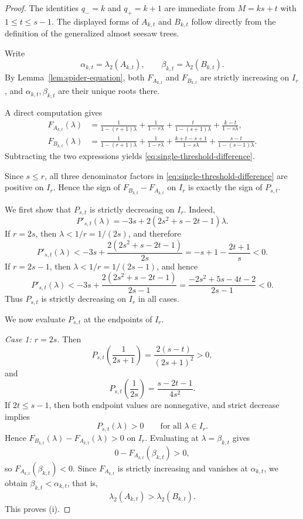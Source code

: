 \documentclass[11pt]{article}
\theoremstyle{remark}
\begin{document}
\begin{proof}
The identities $q_-=k$ and $q_+=k+1$ are immediate from $M=ks+t$ with $1\le t\le s-1$.
The displayed forms of $A_{k,t}$ and $B_{k,t}$ follow directly from the definition of the generalized almost seesaw trees.

Write
$$
\alpha_{k,t}=\lambda_2(A_{k,t}),
\qquad
\beta_{k,t}=\lambda_2(B_{k,t}).
$$
By Lemma~\ref{lem:spider-equation}, both $F_{A_{k,t}}$ and $F_{B_{k,t}}$ are strictly increasing on $I_r$, and $\alpha_{k,t},\beta_{k,t}$ are their unique roots there.

A direct computation gives
\begin{align*}
F_{A_{k,t}}(\lambda)
&=
\frac{1}{1-(r+1)\lambda}
+\frac{1}{1-r\lambda}
+\frac{t}{1-(s+1)\lambda}
+\frac{k-t}{1-s\lambda},\\
F_{B_{k,t}}(\lambda)
&=
\frac{1}{1-(r+1)\lambda}
+\frac{1}{1-r\lambda}
+\frac{k+t-s+1}{1-s\lambda}
+\frac{s-t}{1-(s-1)\lambda}.
\end{align*}
Subtracting the two expressions yields \eqref{eq:single-threshold-difference}.

Since $s\le r$, all three denominator factors in \eqref{eq:single-threshold-difference} are positive on $I_r$.
Hence the sign of $F_{B_{k,t}}-F_{A_{k,t}}$ on $I_r$ is exactly the sign of $P_{s,t}$.

We first show that $P_{s,t}$ is strictly decreasing on $I_r$.
Indeed,
$$
P'_{s,t}(\lambda)=-3s+2(2s^2+s-2t-1)\lambda.
$$
If $r=2s$, then $\lambda<1/r=1/(2s)$, and therefore
$$
P'_{s,t}(\lambda)
<
-3s+\frac{2(2s^2+s-2t-1)}{2s}
=
-s+1-\frac{2t+1}{s}
<0.
$$
If $r=2s-1$, then $\lambda<1/r=1/(2s-1)$, and hence
$$
P'_{s,t}(\lambda)
<
-3s+\frac{2(2s^2+s-2t-1)}{2s-1}
=
\frac{-2s^2+5s-4t-2}{2s-1}
<0.
$$
Thus $P_{s,t}$ is strictly decreasing on $I_r$ in all cases.

We now evaluate $P_{s,t}$ at the endpoints of $I_r$.

\medskip
\noindent
{\it Case 1: $r=2s$.}
Then
$$
P_{s,t}\!\left(\frac1{2s+1}\right)=\frac{2(s-t)}{(2s+1)^2}>0,
$$
and
$$
P_{s,t}\!\left(\frac1{2s}\right)=\frac{s-2t-1}{4s^2}.
$$
If $2t\le s-1$, then both endpoint values are nonnegative, and strict decrease implies
$$
P_{s,t}(\lambda)>0\qquad \text{for all }\lambda\in I_r.
$$
Hence $F_{B_{k,t}}(\lambda)-F_{A_{k,t}}(\lambda)>0$ on $I_r$.
Evaluating at $\lambda=\beta_{k,t}$ gives
$$
0-F_{A_{k,t}}(\beta_{k,t})>0,
$$
so $F_{A_{k,t}}(\beta_{k,t})<0$.
Since $F_{A_{k,t}}$ is strictly increasing and vanishes at $\alpha_{k,t}$, we obtain $\beta_{k,t}<\alpha_{k,t}$, that is,
$$
\lambda_2(A_{k,t})>\lambda_2(B_{k,t}).
$$
This proves \textnormal{(i)}.


\end{proof}
\end{document}
